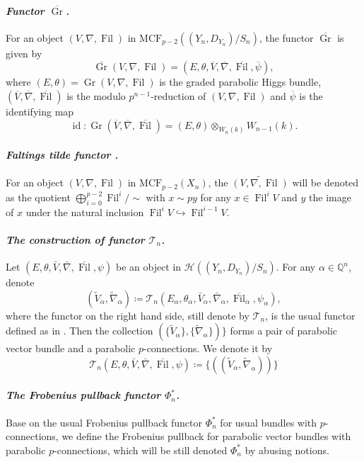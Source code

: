 \documentclass[12pt,twoside]{book}
\theoremstyle{plain}
\theoremstyle{definition}
\theoremstyle{remark}
\newcommand{\bQ}{{\mathbb Q}}
\newcommand{\mH}{{\mathcal H}}
\newcommand{\mT}{{\mathcal T}}
\DeclareMathOperator\Fil{Fil}
\DeclareMathOperator\Gr{Gr}
\DeclareMathOperator\id{id}
\newcommand{\MCF}{\mathrm{MCF}}
\numberwithin{equation}{section}
\begin{document}
\paragraph{\emph{Functor $\overline{\Gr}$.}} For an object $(V,\nabla,\Fil)$ in $\MCF_{p-2}((Y_n,D_{Y_n})/S_n)$, the functor $\overline{\Gr}$ is given by
\[\overline{\Gr}(V,\nabla,\Fil)=(E,\theta,\overline{V},\overline{\nabla},\overline{\Fil},\overline{\psi}),\]
where $(E,\theta)=\Gr(V,\nabla,\Fil)$ is the graded parabolic Higgs bundle, $(\overline{V},\overline{\nabla},\overline{\Fil})$ is the modulo $p^{n-1}$-reduction of $(V,\nabla,\Fil)$ and $\overline{\psi}$ is the identifying map \[\id\colon \Gr(\overline{V},\overline{\nabla},\overline{\Fil})= (E,\theta)\otimes_{W_n(k)}W_{n-1}(k).\]

\paragraph{\emph{Faltings tilde functor .}} For an object $(V,\nabla,\Fil)$ in $\MCF_{p-2}(X_n)$, the $\widetilde{(V,\nabla,\Fil)}$ will be denoted as the quotient $\bigoplus\limits_{i=0}^{p-2}\Fil^i/\sim$ with $x\sim py$ for any $x\in \Fil^iV$ and $y$ the image of $x$ under the natural inclusion $\Fil^iV\hookrightarrow \Fil^{i-1}V$.

\paragraph{\emph{The construction of functor $\mT_n$.}} Let $(E,\theta,\bar{V},\bar{\nabla},\overline{\Fil},\psi)$ be an object in $\mH((Y_n,D_{Y_n})/S_n)$. For any $\alpha\in\bQ^n$, denote
\[(\widetilde{V}_\alpha,\widetilde{\nabla}_\alpha)\coloneqq\mT_n(E_\alpha,\theta_\alpha,\bar{V}_\alpha,\bar{\nabla}_\alpha,\overline{\Fil}_\alpha,\psi_\alpha),\]
where the functor on the right hand side, still denote by $\mT_n$, is the usual functor defined as in \cite{SYZ22}. Then the collection $(\{\widetilde{V}_\alpha\},\{\widetilde{\nabla}_\alpha\})\}$ forms a pair of parabolic vector bundle and a parabolic $p$-connections. We denote it by
\[\mT_n(E,\theta,\bar{V},\bar{\nabla},\overline{\Fil},\psi)\coloneqq\{((\widetilde{V}_\alpha,\widetilde{\nabla}_\alpha))\}\]

\paragraph{\emph{The Frobenius pullback functor $\Phi^*_n$.}}

Base on the usual Frobenius pullback functor $\Phi^*_n$ for usual bundles with $p$-connections, we define the Frobenius pullback for parabolic vector bundles with parabolic $p$-connections, which will be still denoted $\Phi^*_n$ by abusing notions.
\end{document}
